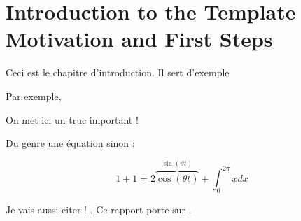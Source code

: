 \chapter[Introduction to the Template: Motivation and First Steps]{Introduction to the Template Motivation and First Steps}
\label{cp:introduction}

Ceci est le chapitre d'introduction. Il sert d'exemple

Par exemple,

\begin{block}[warning]
	On met ici un truc important !
\end{block}

Du genre une équation sinon :

\[1+1=2 \overbrace{\cos(\theta t)}^{\sin(\vartheta t)} + \int_{0}^{2\pi} x dx\]

Je vais aussi citer ! \cite{Elgamal1985}. Ce rapport porte sur \GetTitle.